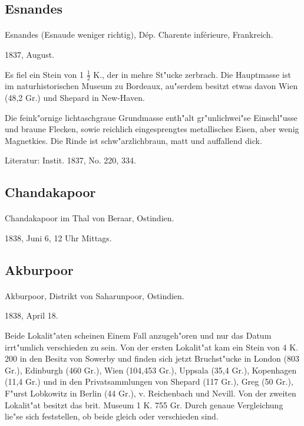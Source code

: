 \documentclass[a4paper, 11pt, oneside]{article}
\begin{document}
\subsection{Esnandes}
\normalsize
\paragraph{}
Esnandes (Esnaude weniger richtig), Dép. Charente inférieure, Frankreich.

1837, August.

Es fiel ein Stein von 1 $\frac{1}{2}$ K., der in mehre St"ucke zerbrach. Die Hauptmasse ist im naturhistorischen Museum zu Bordeaux, au"serdem besitzt etwas davon Wien (48,2 Gr.) und Shepard in New-Haven.

Die feink"ornige lichtaschgraue Grundmasse enth"alt gr"unlichwei"se Einschl"usse und braune Flecken, sowie reichlich eingesprengtes metallisches Eisen, aber wenig Magnetkies. Die Rinde ist schw"arzlichbraun, matt und auffallend dick.

\footnotesize
Literatur: Instit. 1837, No. 220, 334.

\subsection{Chandakapoor}
\normalsize
\paragraph{}
Chandakapoor im Thal von Beraar, Ostindien.

1838, Juni 6, 12 Uhr Mittags.

\subsection{Akburpoor}
\normalsize
\paragraph{}
Akburpoor, Distrikt von Saharunpoor, Ostindien.

1838, April 18.

Beide Lokalit"aten scheinen Einem Fall anzugeh"oren und nur das Datum irrt"umlich verschieden zu sein. Von der ersten Lokalit"at kam ein Stein von 4 K. 200 in den Besitz von Sowerby und finden sich jetzt Bruchst"ucke in London (803 Gr.), Edinburgh (460 Gr.), Wien (104,453 Gr.), Uppsala (35,4 Gr.), Kopenhagen (11,4 Gr.) und in den Privatsammlungen von Shepard (117 Gr.), Greg (50 Gr.), F"urst Lobkowitz in Berlin (44 Gr.), v. Reichenbach und Nevill. Von der zweiten Lokalit"at besitzt das brit. Museum 1 K. 755 Gr. Durch genaue Vergleichung lie"se sich feststellen, ob beide gleich oder verschieden sind.
\end{document}

